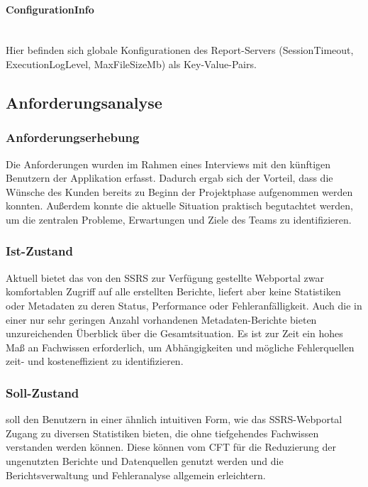 \paragraph{ConfigurationInfo} ~\\
\label{p:ConfigurationInfo}
Hier befinden sich globale Konfigurationen des Report-Servers (SessionTimeout, Execution\-Log\-Level, MaxFileSizeMb) als Key-Value-Pairs.


\subsection{Anforderungsanalyse}
\label{sec:Anforderungsanalyse}

\subsubsection{Anforderungserhebung}
\label{sec:Anforderungserhebung}
Die Anforderungen wurden im Rahmen eines Interviews mit den künftigen Benutzern der Applikation erfasst. Dadurch ergab sich der Vorteil, dass die Wünsche des Kunden bereits zu Beginn der Projektphase aufgenommen werden konnten. Außerdem konnte die aktuelle Situation praktisch begutachtet werden, um die zentralen Probleme, Erwartungen und Ziele des Teams \teamName zu identifizieren.

\subsubsection{Ist-Zustand}
\label{sec:Ist}
Aktuell bietet das von den \ac{SSRS} zur Verfügung gestellte Webportal zwar komfortablen Zugriff auf alle erstellten Berichte, liefert aber keine Statistiken oder Metadaten zu deren Status, Performance oder Fehleranfälligkeit. Auch die in einer nur sehr geringen Anzahl vorhandenen Metadaten-Berichte bieten unzureichenden Überblick über die Gesamtsituation. Es ist zur Zeit ein hohes Maß an Fachwissen erforderlich, um Abhängigkeiten und mögliche Fehlerquellen zeit- und kosteneffizient zu identifizieren.

\subsubsection{Soll-Zustand}
\label{sec:Soll}
\projektName soll den Benutzern in einer ähnlich intuitiven Form, wie das \ac{SSRS}-Webportal Zugang zu diversen Statistiken bieten, die ohne tiefgehendes Fachwissen verstanden werden können. Diese können vom \ac{CFT} \teamName für die Reduzierung der ungenutzten Berichte und Datenquellen genutzt werden und die Berichtsverwaltung und Fehleranalyse allgemein erleichtern.

